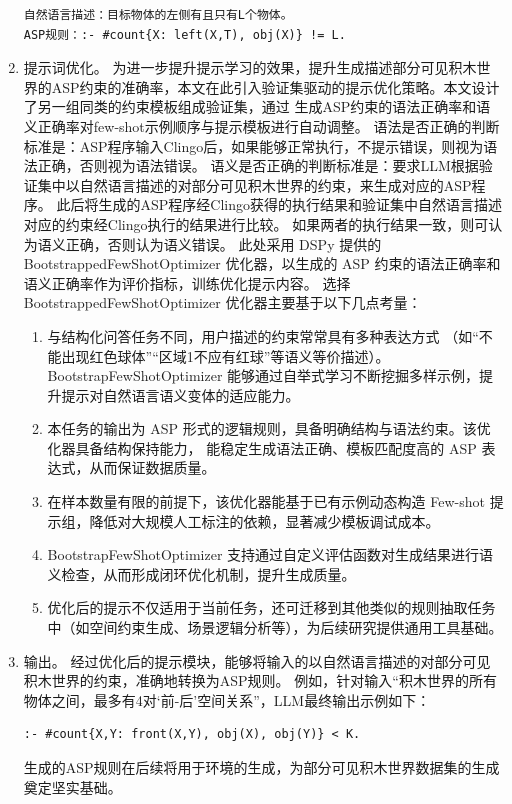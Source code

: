 \begin{enumerate}[nosep]
\begin{lstlisting}
自然语言描述：目标物体的左侧有且只有L个物体。
ASP规则：:- #count{X: left(X,T), obj(X)} != L.
\end{lstlisting}
\item 提示词优化。
为进一步提升提示学习的效果，提升生成描述部分可见积木世界的ASP约束的准确率，本文在此引入验证集驱动的提示优化策略。本文设计了另一组同类的约束模板组成验证集，通过
生成ASP约束的语法正确率和语义正确率对few-shot示例顺序与提示模板进行自动调整。
语法是否正确的判断标准是：ASP程序输入Clingo后，如果能够正常执行，不提示错误，则视为语法正确，否则视为语法错误。
语义是否正确的判断标准是：要求LLM根据验证集中以自然语言描述的对部分可见积木世界的约束，来生成对应的ASP程序。
此后将生成的ASP程序经Clingo获得的执行结果和验证集中自然语言描述对应的约束经Clingo执行的结果进行比较。
如果两者的执行结果一致，则可认为语义正确，否则认为语义错误。
此处采用 DSPy 提供的 BootstrappedFewShotOptimizer 优化器，以生成的 ASP 约束的语法正确率和语义正确率作为评价指标，训练优化提示内容。
选择 BootstrappedFewShotOptimizer 优化器主要基于以下几点考量：
\begin{enumerate}[nosep]
\item 与结构化问答任务不同，用户描述的约束常常具有多种表达方式
（如“不能出现红色球体”“区域1不应有红球”等语义等价描述）。BootstrapFewShotOptimizer 
能够通过自举式学习不断挖掘多样示例，提升提示对自然语言语义变体的适应能力。
\item 本任务的输出为 ASP 形式的逻辑规则，具备明确结构与语法约束。该优化器具备结构保持能力，
能稳定生成语法正确、模板匹配度高的 ASP 表达式，从而保证数据质量。
\item 在样本数量有限的前提下，该优化器能基于已有示例动态构造 Few-shot 提示组，降低对大规模人工标注的依赖，显著减少模板调试成本。
\item BootstrapFewShotOptimizer 支持通过自定义评估函数对生成结果进行语义检查，从而形成闭环优化机制，提升生成质量。
\item 优化后的提示不仅适用于当前任务，还可迁移到其他类似的规则抽取任务中（如空间约束生成、场景逻辑分析等），为后续研究提供通用工具基础。
\end{enumerate}
\item 输出。
经过优化后的提示模块，能够将输入的以自然语言描述的对部分可见积木世界的约束，准确地转换为ASP规则。
例如，针对输入“积木世界的所有物体之间，最多有4对‘前-后’空间关系”，LLM最终输出示例如下：
\begin{lstlisting}
:- #count{X,Y: front(X,Y), obj(X), obj(Y)} < K.
\end{lstlisting}
生成的ASP规则在后续将用于环境的生成，为部分可见积木世界数据集的生成奠定坚实基础。
\end{enumerate}
